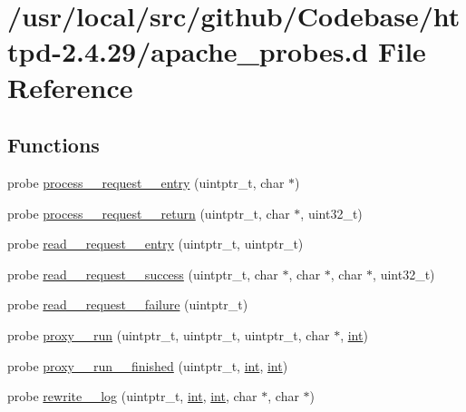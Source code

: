 \hypertarget{apache__probes_8d}{}\section{/usr/local/src/github/\+Codebase/httpd-\/2.4.29/apache\+\_\+probes.d File Reference}
\label{apache__probes_8d}
\subsection*{Functions}
\begin{DoxyCompactItemize}
\item 
probe \hyperlink{apache__probes_8d_a62a075790b632653c60b390b9af61232}{process\+\_\+\+\_\+request\+\_\+\+\_\+entry} (uintptr\+\_\+t, char $\ast$)
\item 
probe \hyperlink{apache__probes_8d_ace683eebab2204149b1b6f4d0a548fc8}{process\+\_\+\+\_\+request\+\_\+\+\_\+return} (uintptr\+\_\+t, char $\ast$, uint32\+\_\+t)
\item 
probe \hyperlink{apache__probes_8d_a3b57ac420501d00bd00acf465e31c6e2}{read\+\_\+\+\_\+request\+\_\+\+\_\+entry} (uintptr\+\_\+t, uintptr\+\_\+t)
\item 
probe \hyperlink{apache__probes_8d_aceb6ded3ef21e078961cc1a26d1f8b89}{read\+\_\+\+\_\+request\+\_\+\+\_\+success} (uintptr\+\_\+t, char $\ast$, char $\ast$, char $\ast$, uint32\+\_\+t)
\item 
probe \hyperlink{apache__probes_8d_a71acf4adcdbc8909f46a7d5210495246}{read\+\_\+\+\_\+request\+\_\+\+\_\+failure} (uintptr\+\_\+t)
\item 
probe \hyperlink{apache__probes_8d_a90dd4a1e5e2f2ff4a7a6e26777c249b3}{proxy\+\_\+\+\_\+run} (uintptr\+\_\+t, uintptr\+\_\+t, uintptr\+\_\+t, char $\ast$, \hyperlink{pcre_8txt_a42dfa4ff673c82d8efe7144098fbc198}{int})
\item 
probe \hyperlink{apache__probes_8d_ab6c80f882204333df3e96e7ad73d6e24}{proxy\+\_\+\+\_\+run\+\_\+\+\_\+finished} (uintptr\+\_\+t, \hyperlink{pcre_8txt_a42dfa4ff673c82d8efe7144098fbc198}{int}, \hyperlink{pcre_8txt_a42dfa4ff673c82d8efe7144098fbc198}{int})
\item 
probe \hyperlink{apache__probes_8d_af954b0337c07d9e30f0cdda2b892f727}{rewrite\+\_\+\+\_\+log} (uintptr\+\_\+t, \hyperlink{pcre_8txt_a42dfa4ff673c82d8efe7144098fbc198}{int}, \hyperlink{pcre_8txt_a42dfa4ff673c82d8efe7144098fbc198}{int}, char $\ast$, char $\ast$)
\item 

\end{DoxyCompactItemize}
